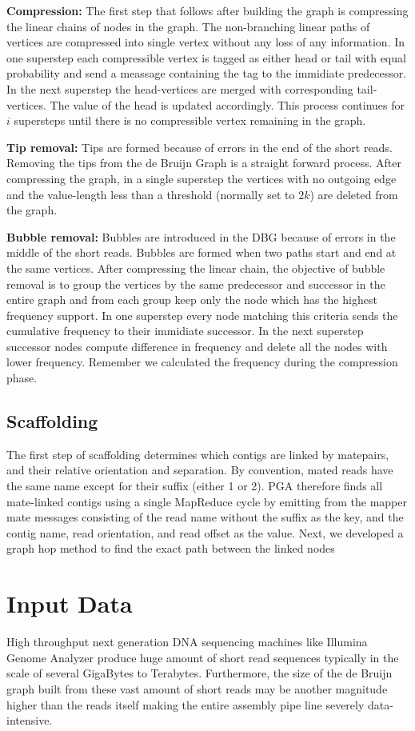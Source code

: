 \documentclass[conference]{IEEEtran}
\begin{document}
\textbf{Compression:} The first step that follows after building the graph is compressing the linear chains of nodes in the graph.
The non-branching linear paths of vertices are compressed into single vertex without any loss of any information.
In one superstep each compressible vertex is tagged as either head or tail with equal probability and send a meassage containing the tag to the immidiate predecessor.
In the next superstep the head-vertices are merged with corresponding tail-vertices.
The value of the head is updated accordingly. 
This process continues for $i$ supersteps until there is no compressible vertex remaining in the graph.

\textbf{Tip removal:} Tips are formed because of errors in the end of the short reads.
Removing the tips from the de Bruijn Graph is a straight forward process.
After compressing the graph, in a single superstep the vertices with no outgoing edge and the value-length less than a threshold (normally set to $2k$) are deleted from the graph.

\textbf{Bubble removal:} Bubbles are introduced in the DBG because of errors in the middle of the short reads.
Bubbles are formed when two paths start and end at the same vertices.
After compressing the linear chain, the objective of bubble removal is to group the vertices by the same predecessor and successor in the entire graph and from each group keep only the node which has the highest frequency support.
In one superstep every node matching this criteria sends the cumulative frequency to their immidiate successor.
In the next superstep successor nodes compute difference in frequency and delete all the nodes with lower frequency.
Remember we calculated the frequency during the compression phase.

\subsection {Scaffolding}
The first step of scaffolding determines which contigs are linked by matepairs, and their relative orientation and separation. By convention, mated reads have the same name except for their suffix (either 1 or 2). 
PGA therefore finds all mate-linked contigs using a single MapReduce cycle by emitting from the mapper mate messages consisting of the read name without the suffix as the key, and the contig name, read orientation, and read offset as the value.
Next, we developed a graph hop method to find the exact path between the linked nodes

\section {Input Data} \label{InputData}
High throughput next generation DNA sequencing machines like Illumina Genome Analyzer produce huge amount of short read sequences typically in the scale of several GigaBytes to Terabytes.
Furthermore, the size of the de Bruijn graph built from these vast amount of short reads may be another magnitude higher than the reads itself making the entire assembly pipe line severely data-intensive.
\end{document}

